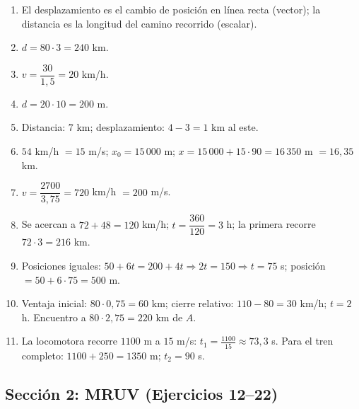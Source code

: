 \documentclass[12pt, letterpaper]{article}
\begin{document}
  \begin{enumerate}[leftmargin=*, label=\textbf{\arabic*.}]
    \setcounter{enumi}{0}
    \item El desplazamiento es el cambio de posición en línea recta (vector); la distancia es la longitud del camino recorrido (escalar).
    \item $d = 80 \cdot 3 = 240$ km.
    \item $v = \dfrac{30}{1{,}5} = 20$ km/h.
    \item $d = 20 \cdot 10 = 200$ m.
    \item Distancia: $7$ km; desplazamiento: $4 - 3 = 1$ km al este.
    \item $54$ km/h $= 15$ m/s; $x_0 = 15\,000$ m; $x = 15\,000 + 15 \cdot 90 = 16\,350$ m $= 16{,}35$ km.
    \item $v = \dfrac{2700}{3{,}75} = 720$ km/h $= 200$ m/s.
    \item Se acercan a $72 + 48 = 120$ km/h; $t = \dfrac{360}{120} = 3$ h; la primera recorre $72 \cdot 3 = 216$ km.
    \item Posiciones iguales: $50 + 6t = 200 + 4t \Rightarrow 2t = 150 \Rightarrow t = 75$ s; posición $= 50 + 6 \cdot 75 = 500$ m.
    \item Ventaja inicial: $80 \cdot 0{,}75 = 60$ km; cierre relativo: $110 - 80 = 30$ km/h; $t = 2$ h. Encuentro a $80 \cdot 2{,}75 = 220$ km de $A$.
    \item La locomotora recorre $1100$ m a $15$ m/s: $t_1 = \frac{1100}{15} \approx 73{,}3$ s. Para el tren completo: $1100 + 250 = 1350$ m; $t_2 = 90$ s.
  \end{enumerate}

  \subsection*{Sección 2: MRUV (Ejercicios 12--22)}
\end{document}
